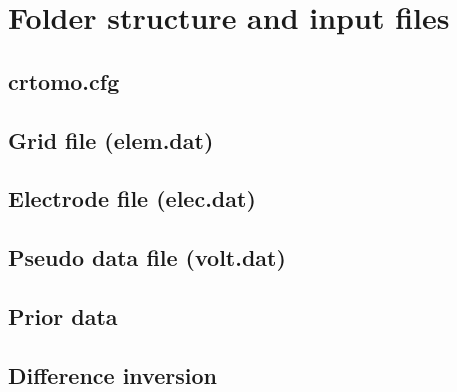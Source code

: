 \documentclass[12pt,a4paper,twoside,titlepage,draft]{book}
\theoremstyle{aufgaben}
\theoremstyle{remark}
\begin{document}
\section{Folder structure and input files}\label{sect:crtomo_dir}
\subsection{crtomo.cfg}\label{sub:crtomo_input}
\subsection{Grid file (elem.dat)}\label{sub:crtomo_grid}
\subsection{Electrode file (elec.dat)}\label{sub:crtomo_elec}
\subsection{Pseudo data file (volt.dat)}\label{sub:crtomo_volt}
\subsection{Prior data}\label{sub:crtomo_prior}
\subsection{Difference inversion}\label{sub:crtomo_diffinv}
\printindex
\end{document}
